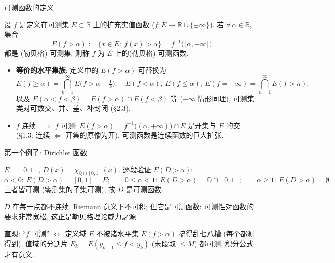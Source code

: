 
\begin{frame}{可测函数的定义}

\begin{Def}[可测函数]
设 $f$ 是定义在\alert{可测集} $E \subset \mathbb{R}$ 上的\alert{扩充实值}函数 ($f: E \to \mathbb{R} \cup \{\pm\infty\}$). 若 $\forall\, \alpha \in \mathbb{R}$, 集合
\[
E(f > \alpha) := \{x \in E:\ f(x) > \alpha\} = f^{-1}\big((\alpha, +\infty]\big)
\]
都是 (勒贝格) 可测集, 则称 $f$ 为 $E$ 上的\alert{(勒贝格) 可测函数}.
\end{Def}

\pause

\begin{remark}
\begin{itemize}
\item \textbf{等价的水平集族}: 定义中的 $E(f > \alpha)$ 可替换为
\[
E(f \geqslant \alpha) = \bigcap_{k=1}^\infty E\big(f > \alpha - \tfrac{1}{k}\big), \quad
E(f < \alpha),\ E(f \leqslant \alpha),\ E(f = +\infty) = \bigcap_{n=1}^\infty E(f > n),
\]
以及 $E(\alpha < f < \beta) = E(f > \alpha) \cap E(f < \beta)$ 等 ($-\infty$ 情形同理), 可测集类对\alert{可数交、并、差、补}封闭 (§2.3).
\item $f$ 连续 $\implies$ $f$ 可测: $E(f > \alpha) = f^{-1}\big((\alpha, +\infty)\big) \cap E$ 是开集与 $E$ 的交 (§1.3: 连续 $\iff$ 开集的原像为开). \alert{可测函数是连续函数的巨大扩张}.
\end{itemize}
\end{remark}

\end{frame}


\begin{frame}{第一个例子: Dirichlet 函数}

\begin{eg}[Dirichlet 函数]
$E = [0, 1]$, $D(x) = \chi_{\mathbb{Q} \cap [0,1]}(x)$. 逐段验证 $E(D > \alpha)$:
\[
\alpha < 0:\ E(D>\alpha) = [0,1] = E;
\qquad
0 \leqslant \alpha < 1:\ E(D>\alpha) = \mathbb{Q} \cap [0,1];
\qquad
\alpha \geqslant 1:\ E(D>\alpha) = \emptyset.
\]
三者皆可测 (零测集的子集可测), 故 $D$ 是\alert{可测函数}.
\end{eg}

\pause

\begin{attnblock}
$D$ 在\alert{每一点都不连续}, Riemann 意义下不可积; 但它是可测函数: 可测性对函数的要求\alert{非常宽松}, 这正是勒贝格理论威力之源.
\end{attnblock}

\pause

\begin{remark}
直观: ``$f$ 可测'' $\iff$ 定义域 $E$ 不被诸水平集 $E(f>\alpha)$ 搞得乱七八糟 (每个都测得到), 值域的分割片 $E_k = E(y_{k-1} \leqslant f < y_k)$ (末段取 $\leqslant M$) 都可测, 积分公式才有意义.
\end{remark}

\end{frame}


